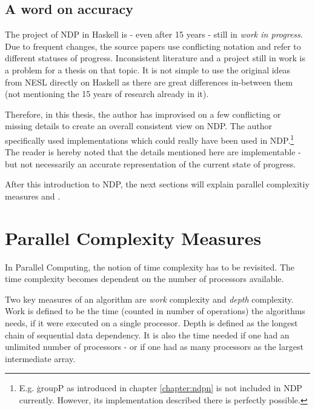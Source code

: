   \subsection*{A word on accuracy}
    The project of NDP in Haskell is - even after 15 years -
    still in \textit{work in progress}. Due to frequent changes,
    the source papers use conflicting notation and refer to
    different statuses of progress. Inconsistent literature and a project
    still in work is a problem for a thesis on that topic.
    It is not simple to use the original ideas from NESL directly
    on Haskell as there are great differences in-between them (not mentioning
    the 15 years of research already in it).
    
    Therefore, in this thesis, the author has improvised on a few conflicting or
    missing details to create an overall consistent view on NDP.
    The author specifically used implementations which could really have been
    used in NDP.\footnote{E.g. \c{groupP} as introduced in chapter \ref{chapter:ndpn}
    is not included in NDP currently. However, its implementation described there is perfectly possible.}
    The reader is hereby noted that the details
    mentioned here are implementable - but not necessarily an accurate
    representation of the current state of progress.
    
    After this introduction to NDP, the next sections will explain
    parallel complexitiy measures and \algo.
  
\section{Parallel Complexity Measures}
  \label{section:parmeasures}
  In Parallel Computing, the notion of time complexity
  has to be revisited. The time complexity becomes dependent on the
  number of processors available.
  
  Two key measures of an algorithm are \emph{work} complexity
  and \emph{depth} complexity. Work is defined
  to be the time (counted in number of operations)
  the algorithms needs, if it were executed on a single processor.
  Depth is defined as the longest chain of sequential data dependency.
  It is also the time needed if one had an unlimited number of processors -
  or if one had as many processors as the largest intermediate array.
  
  
